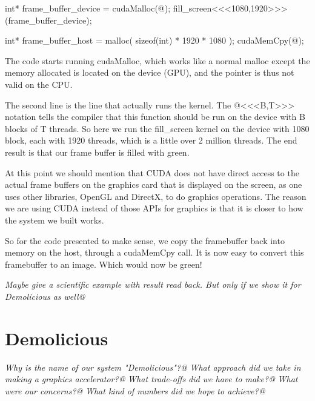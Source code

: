 \documentclass[../main/report.tex]{subfiles}
\begin{document}
\begin{c-code}[caption=Starting the CUDA kernel with one thread per pixel, label=cuda-kernel-launch]
int* frame_buffer_device = cudaMalloc(@);
fill_screen<<<1080,1920>>>(frame_buffer_device);

int* frame_buffer_host = malloc( sizeof(int) * 1920 * 1080 );
cudaMemCpy(@);
\end{c-code}

The code starts running cudaMalloc, which works like a normal malloc except the memory allocated is located on the device (GPU), and the pointer is thus not valid on the CPU.

The second line is the line that actually runs the kernel. 
The @<<<B,T>>> notation tells the compiler that this function should be run on the device with B blocks of T threads.
So here we run the fill\_screen kernel on the device with 1080 block, each with 1920 threads, which is a little over 2 million threads.
The end result is that our frame buffer is filled with green.

At this point we should mention that CUDA does not have direct access to the actual frame buffers on the graphics card that is displayed on the screen, as one uses other libraries, OpenGL and DirectX, to do graphics operations. 
The reason we are using CUDA instead of those APIs for graphics is that it is closer to how the system we built works.

So for the code presented to make sense, we copy the framebuffer back into memory on the host, through a cudaMemCpy call.
It is now easy to convert this framebuffer to an image.
Which would now be green! 





\emph{Maybe give a scientific example with result read back. But only if we show it for Demolicious as well@}


\section{Demolicious}

\textit{Why is the name of our system "Demolicious"?@}
\textit{What approach did we take in making a graphics accelerator?@}
\textit{What trade-offs did we have to make?@}
\textit{What were our concerns?@}
\textit{What kind of numbers did we hope to achieve?@}
\end{document}
